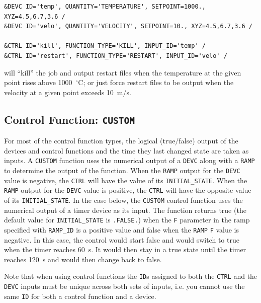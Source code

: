 \documentclass[11pt]{book}
\newcommand{\ct}{\tt\small}
\begin{document}
\footnotesize
\begin{verbatim}
&DEVC ID='temp', QUANTITY='TEMPERATURE', SETPOINT=1000., XYZ=4.5,6.7,3.6 /
&DEVC ID='velo', QUANTITY='VELOCITY', SETPOINT=10., XYZ=4.5,6.7,3.6 /

&CTRL ID='kill', FUNCTION_TYPE='KILL', INPUT_ID='temp' /
&CTRL ID='restart', FUNCTION_TYPE='RESTART', INPUT_ID='velo' /
\end{verbatim} \normalsize

\noindent
will ``kill'' the job and output restart files when the temperature at the given point rises above
1000~$^\circ$C; or just force restart files to be output when the velocity at a given point exceeds 10~m/s.



\subsection{Control Function: \texorpdfstring{{\tt CUSTOM}}{CUSTOM} }
\label{info:CUSTOM}

For most of the control function types, the logical (true/false) output of
the devices and control functions and the time they last changed
state are taken as inputs.  A {\ct CUSTOM} function uses the numerical output of a {\ct DEVC} along with
a {\ct RAMP} to determine the output of the function.  When the {\ct RAMP} output for the {\ct DEVC} value is negative, the
{\ct CTRL} will have the value of its {\ct INITIAL\_STATE}.  When the {\ct RAMP} output for the {\ct DEVC} value is positive, the
{\ct CTRL} will have the opposite value of its {\ct INITIAL\_STATE}. In the case below, the {\ct CUSTOM}
control function uses the numerical output of a timer device as its input.  The function returns true (the default value for
{\ct INITIAL\_STATE} is {\ct .FALSE.}) when the {\ct F} parameter
in the ramp specified with {\ct RAMP\_ID} is a positive value and
false when the {\ct RAMP} {\ct F} value is negative.
In this case, the control would start false and would switch to
true when the timer reaches 60~s.  It would then stay in a true
state until the timer reaches 120~s and would then change back to false.

\begin{warning}
Note that when using control functions the {\ct ID}s assigned to both the
{\ct CTRL} and the {\ct DEVC} inputs must be unique across both sets of inputs, i.e. you cannot use the
same {\ct ID} for both a control function and a device.
\end{warning}
\end{document}
